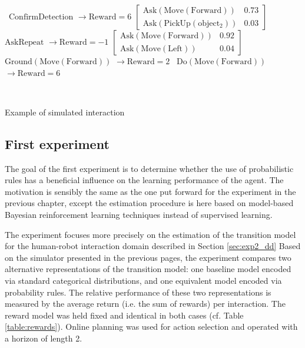 \begin{Transcript}[p!]
\begin{normalsize}
\begin{dialogue}
 \ $\mathrm{ConfirmDetection}$ \hspace{34mm} $\rightarrow \mathrm{Reward} = 6$ \vspace{3mm}
 $\begin{bmatrix}\mathrm{Ask(Move(Forward))} & 0.73 \\
\mathrm{Ask(PickUp(object_2))}& 0.03 \end{bmatrix}$ \vspace{3mm}
 \ $\mathrm{AskRepeat}$ \hspace{47mm} $\rightarrow \mathrm{Reward} = -1$ \vspace{3mm}
 $\begin{bmatrix}\mathrm{Ask(Move(Forward))} & 0.92 \\
\mathrm{Ask(Move(Left))} & 0.04 \end{bmatrix}$ \vspace{3mm}
 \ $\mathrm{Ground(Move(Forward))}$ \hspace{22mm} $\rightarrow \mathrm{Reward} = 2$ \vspace{3mm}
 \ $\mathrm{Do(Move(Forward))}$ \hspace{31mm} $\rightarrow \mathrm{Reward} = 6$
\end{dialogue}
$\phantom{a}$\hspace{13mm} \vspace{3mm}
\end{normalsize}
\caption{Example of simulated interaction}
\end{Transcript}

\subsection{First experiment}

The goal of the first experiment is to determine whether the use of probabilistic rules has a beneficial influence on the learning performance of the agent. The motivation is sensibly the same as the one put forward for the experiment in the previous chapter, except the estimation procedure is here based on model-based Bayesian reinforcement learning techniques instead of supervised learning. 

The experiment focuses more precisely on the estimation of the transition model for the human-robot interaction domain described in Section \ref{sec:exp2_dd} Based on the simulator presented in the previous pages, the experiment compares two alternative representations of the transition model: one baseline model encoded via standard categorical distributions, and one equivalent model encoded via probability rules.  The relative performance of these two representations is measured by the average return (i.e. the sum of rewards) per interaction. The reward model was held fixed and identical in both cases (cf. Table \ref{table:rewards}). Online planning was used for action selection and operated with a horizon of length 2.  

